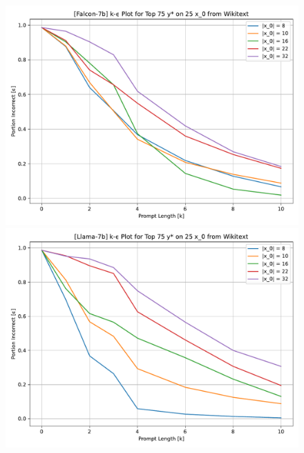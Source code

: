 \documentclass{article} %
\begin{document}
\begin{figure}[ht]
    \centering
    \begin{minipage}[b]{0.48\textwidth}
        \includegraphics[width=\textwidth]{figs/shallow1_falcon7b_k_epsilon.pdf}
    \end{minipage}
    \hfill
    \begin{minipage}[b]{0.48\textwidth}
        \includegraphics[width=\textwidth]{figs/shallow1_llama7b_k_epsilon.pdf}
    \end{minipage}
    \vspace{1em} %

\end{figure}
\end{document}
